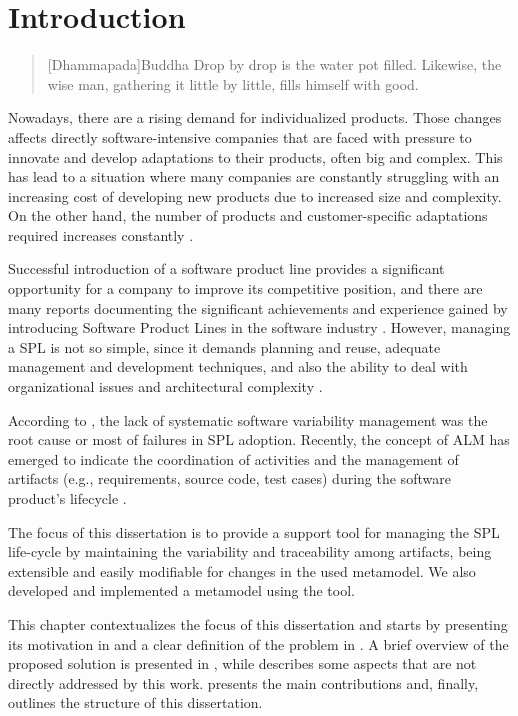 \chapter{Introduction}
\label{ch:introduction}

\begin{quotation}[Dhammapada]{Buddha}
Drop by drop is the water pot filled. Likewise, the wise man, gathering it little by little, fills himself with good.
\end{quotation}

Nowadays, there are a rising demand for individualized products. Those changes affects directly software-intensive companies that are faced with pressure to innovate and develop adaptations to their products, often big and complex. This has lead to a situation where many companies are constantly struggling with an increasing cost of developing new products due to increased size and complexity. On the other hand, the number of products and customer-specific adaptations required increases constantly \citep{rafael2013systems}.

Successful introduction of a software product line provides a significant opportunity for a company to improve its competitive position, and there are many reports documenting the significant achievements and experience gained by introducing Software Product Lines in the software industry \citep{Pohl2005}. However, managing a \acf{SPL} is not so simple, since it demands planning and reuse, adequate management and development techniques, and also the ability to deal with organizational issues and architectural complexity \citep{CavalcantiInTech2012}. 

According to \citet{rafael2013systems} , the lack of systematic software variability management was the root cause or most of failures in \acf{SPL} adoption. Recently, the concept of \acf{ALM} has emerged to indicate the coordination of activities and the management of artifacts (e.g., requirements, source code, test cases) during the software product's lifecycle \citep{Schwaber2006}. 

The focus of this dissertation is to provide a support tool for managing the \acf{SPL} life-cycle by maintaining the variability and traceability among artifacts, being extensible and easily modifiable for changes in the used metamodel. We also developed and implemented a metamodel using the tool.


This chapter contextualizes the focus of this dissertation and starts by presenting its
motivation in   and a clear definition of the problem in . A brief overview of the proposed solution is presented in , while  describes some aspects that are not directly addressed by this work.
 presents the main contributions and, finally,
 outlines the structure of this dissertation.






